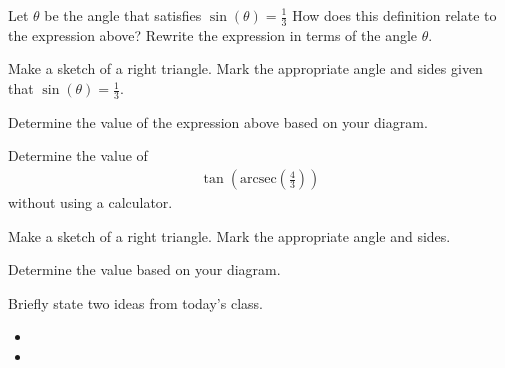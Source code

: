 \begin{problem}
  \begin{subproblem}
  \item Let $\theta$ be the angle that satisfies ${\displaystyle \sin\left(\theta\right)=\frac{1}{3}}$
    How does this definition relate to the expression above? Rewrite the expression in terms of the angle $\theta$.
    \vspace{3em}
  \item Make a sketch of a right triangle. Mark the appropriate angle
    and sides given that ${\displaystyle \sin\left(\theta\right)=\frac{1}{3}}$.
    \vfill
  \item Determine the value of the expression above based on your diagram.
    \vfill
    \vfill
  \end{subproblem}

  \clearpage

\item Determine the value of
  \begin{eqnarray*}
    \tan\left(\mathrm{arcsec}\left(\frac{4}{3}\right)\right)
  \end{eqnarray*}
  without using a calculator.

  \begin{subproblem}
  \item Make a sketch of a right triangle. Mark the appropriate angle
    and sides.
    \vfill
  \item Determine the value based on your diagram.
    \vfill
    \vfill
  \end{subproblem}

\end{problem}

\postClass

\begin{problem}
\item Briefly state two ideas from today's class.
  \begin{itemize}
  \item
  \item
  \end{itemize}
\item
  \begin{subproblem}
    \item
  \end{subproblem}
\end{problem}


